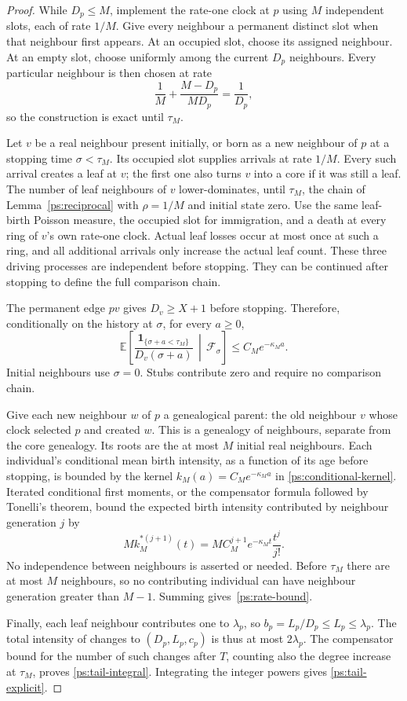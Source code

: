 \begin{proof}
While $D_p\le M$, implement the rate-one clock at $p$ using $M$
independent slots, each of rate $1/M$.  Give every neighbour a permanent
distinct slot when that neighbour first appears.  At an occupied slot,
choose its assigned neighbour.  At an empty slot, choose uniformly
among the current $D_p$ neighbours.  Every particular neighbour is
then chosen at rate
\[
 \frac1M+\frac{M-D_p}{M D_p}=\frac1{D_p},
\]
so the construction is exact until $\tau_M$.

Let $v$ be a real neighbour present initially, or born as a new
neighbour of $p$ at a stopping time $\sigma<\tau_M$.  Its occupied
slot supplies arrivals at rate $1/M$.  Every such arrival creates a
leaf at $v$; the first one also turns $v$ into a core if it was still
a leaf.  The number of leaf neighbours of $v$ lower-dominates, until
$\tau_M$, the chain of Lemma~\ref{ps:reciprocal} with $\rho=1/M$
and initial state zero.  Use the same leaf-birth Poisson measure,
the occupied slot for immigration, and a death at every ring of
$v$'s own rate-one clock.  Actual leaf losses occur at most once at
such a ring, and all additional arrivals only increase the actual
leaf count.  These three driving processes are independent before
stopping.  They can be continued after stopping to define the full
comparison chain.

The permanent edge $pv$ gives $D_v\ge X+1$ before stopping.  Therefore,
conditionally on the history at $\sigma$, for every $a\ge0$,
\begin{equation}\label{ps:conditional-kernel}
 \mathbb E\left[
   \frac{\mathbf1_{\{\sigma+a<\tau_M\}}}{D_v(\sigma+a)}
   \,\middle|\,\mathcal F_\sigma\right]
 \le C_Me^{-\kappa_Ma}.
\end{equation}
Initial neighbours use $\sigma=0$.  Stubs contribute zero and require
no comparison chain.

Give each new neighbour $w$ of $p$ a genealogical parent: the old
neighbour $v$ whose clock selected $p$ and created $w$.
This is a genealogy of neighbours, separate from the core genealogy.
Its roots are the at most $M$ initial real neighbours.  Each individual's
conditional mean birth intensity, as a function of its age before
stopping, is bounded by the kernel
$k_M(a)=C_Me^{-\kappa_Ma}$ in
\eqref{ps:conditional-kernel}.
Iterated conditional first moments, or the compensator formula followed
by Tonelli's theorem, bound the expected birth intensity contributed
by neighbour generation $j$ by
\[
 M k_M^{*(j+1)}(t)
 =M C_M^{j+1}e^{-\kappa_Mt}\frac{t^j}{j!}.
\]
No independence between neighbours is asserted or needed.
Before $\tau_M$ there are at most $M$ neighbours, so no contributing
individual can have neighbour generation greater than $M-1$.
Summing gives~\eqref{ps:rate-bound}.

Finally, each leaf neighbour contributes one to $\lambda_p$, so
$b_p=L_p/D_p\le L_p\le\lambda_p$.  The total intensity of changes
to $(D_p,L_p,c_p)$ is thus at most $2\lambda_p$.
The compensator bound for the number of such changes after $T$, counting
also the degree increase at $\tau_M$, proves
\eqref{ps:tail-integral}.  Integrating the integer powers gives
\eqref{ps:tail-explicit}.
\end{proof}


